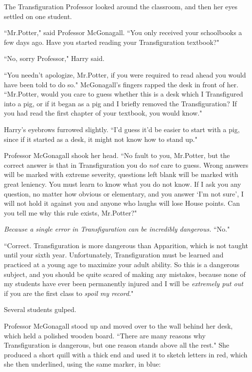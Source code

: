 The Transfiguration Professor looked around the classroom, and then her eyes settled on one student.

``Mr.\?Potter," said Professor McGonagall. ``You only received your schoolbooks a few days ago. Have you started reading your Transfiguration textbook?"

``No, sorry Professor," Harry said.

``You needn't apologize, Mr.\?Potter, if you were required to read ahead you would have been told to do so." McGonagall's fingers rapped the desk in front of her. ``Mr.\?Potter, would you care to guess whether this is a desk which I Transfigured into a pig, or if it began as a pig and I briefly removed the Transfiguration? If you had read the first chapter of your textbook, you would know."

Harry's eyebrows furrowed slightly. ``I'd guess it'd be easier to start with a pig, since if it started as a desk, it might not know how to stand up."

Professor McGonagall shook her head. ``No fault to you, Mr.\?Potter, but the correct answer is that in Transfiguration you do \emph{not} care to guess. Wrong answers will be marked with extreme severity, questions left blank will be marked with great leniency. You must learn to know what you do not know. If I ask you any question, no matter how obvious or elementary, and you answer `I'm not sure', I will not hold it against you and anyone who laughs will lose House points. Can you tell me why this rule exists, Mr.\?Potter?"

\emph{Because a single error in Transfiguration can be incredibly dangerous.} ``No."

``Correct. Transfiguration is more dangerous than Apparition, which is not taught until your sixth year. Unfortunately, Transfiguration must be learned and practiced at a young age to maximize your adult ability. So this is a dangerous subject, and you should be quite scared of making any mistakes, because none of my students have ever been permanently injured and I will be \emph{extremely put out} if you are the first class to \emph{spoil my record}."

Several students gulped.

Professor McGonagall stood up and moved over to the wall behind her desk, which held a polished wooden board. ``There are many reasons why Transfiguration is dangerous, but one reason stands above all the rest." She produced a short quill with a thick end and used it to sketch letters in red, which she then underlined, using the same marker, in blue:

